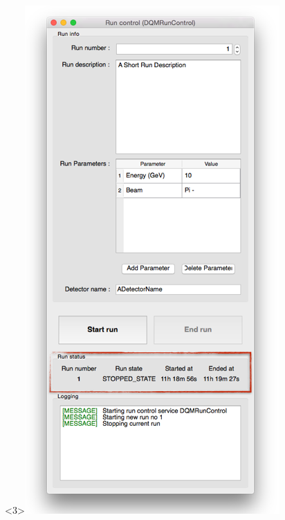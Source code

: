 \documentclass[8pt]{beamer}
\begin{document}
\begin{frame}
\begin{center}
\begin{overlayarea}{\textwidth}{\textheight}
\begin{columns}
\begin{center}
            \begin{onlyenv}<3>\includegraphics[width=\textwidth]{figs/RunControl/RunControl_Status.png}\end{onlyenv}

\end{center}
\end{columns}
\end{overlayarea}
\end{center}
\end{frame}
\end{document}
